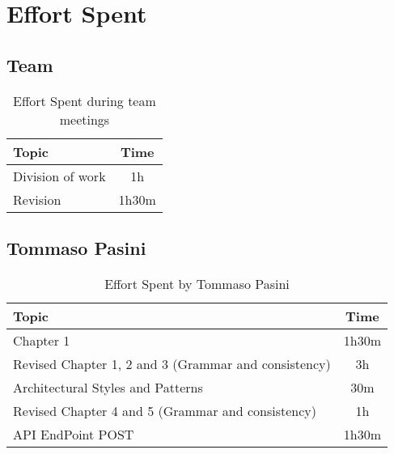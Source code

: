 \chapter{Effort Spent}

\section*{Team}


\begin{table}[H]
    \renewcommand{\arraystretch}{1.5}
    \centering
    \begin{tabular}{|l|c|}
        \hline
        \textbf{Topic}   & \textbf{Time} \\ \hline
        Division of work & 1h            \\ \hline
        Revision         & 1h30m            \\ \hline
    \end{tabular}
    \caption{Effort Spent during team meetings}
    \label{tab:group-effort-spent}
\end{table}

\section*{Tommaso Pasini}
\begin{table}[H]
    \renewcommand{\arraystretch}{1.5}
    \centering
    \begin{tabular}{|l|c|}
        \hline
        \textbf{Topic}                                          & \textbf{Time}     \\ \hline
        Chapter 1                                               & 1h30m             \\ \hline
        Revised Chapter 1, 2 and 3 (Grammar and consistency)    & 3h                \\ \hline
        Architectural Styles and Patterns                       & 30m               \\ \hline
        Revised Chapter 4 and 5 (Grammar and consistency)       & 1h                \\ \hline
        API EndPoint POST                                       & 1h30m             \\ \hline
    \end{tabular}
    \caption{Effort Spent by Tommaso Pasini}
    \label{tab:pasini-effort-spent}
\end{table}

